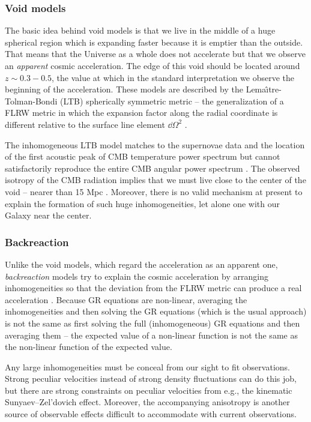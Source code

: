 \subsubsection{Void models}
The basic idea behind void models is that we live in the middle of a huge spherical region which is expanding faster because it is emptier than the outside. That means that the Universe as a whole does not accelerate but that we observe an \textit{apparent} cosmic acceleration. The edge of this void should be located around $z\sim0.3-0.5$, the value at which in the standard interpretation we observe the beginning of the acceleration. These models are described by the Lema\^\i tre-Tolman-Bondi (LTB) spherically symmetric metric -- the generalization of a FLRW metric in which the expansion factor along the radial coordinate is different relative to the surface line element $\dd\Omega^2$ \parencite{2013JCAP...02..047D,2006PhRvD..73h3519A}.

The inhomogeneous LTB model matches to the supernovae data and the location of the first acoustic peak of CMB temperature power spectrum but cannot satisfactorily reproduce the entire CMB angular power spectrum \parencite{2011JCAP...02..013C}. The observed isotropy of the CMB radiation implies that we must live close to the center of the void -- nearer than 15 Mpc \parencite{2006PhRvD..74j3520A}. Moreover, there is no valid mechanism at present to explain the formation of such huge inhomogeneities, let alone one with our Galaxy near the center.
\subsubsection{Backreaction}
Unlike the void models, which regard the acceleration as an apparent one, \textit{backreaction} models try to explain the cosmic acceleration by arranging inhomogeneities so that the deviation from the FLRW metric can produce a real acceleration \parencite{2011CQGra..28w5002S,2004JCAP...02..003R,2005PhRvD..72b3507M}. Because GR equations are non-linear, averaging the inhomogeneities and then solving the GR equations (which is the usual approach) is not the same as first solving the full (inhomogeneous) GR equations and then averaging them -- the expected value of a non-linear function is not the same as the non-linear function of the expected value.

Any large inhomogeneities must be conceal from our sight to fit observations. Strong peculiar velocities instead of strong density fluctuations can do this job, but there are strong constraints on peculiar velocities from e.g., the kinematic Sunyaev--Zel'dovich effect. Moreover, the accompanying anisotropy is another source of observable effects difficult to accommodate with current observations.

